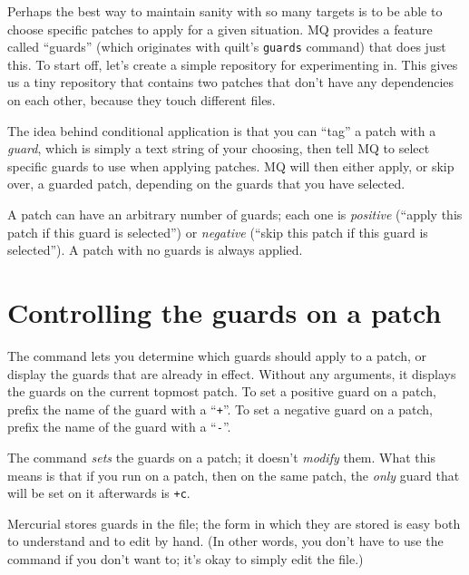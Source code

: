 Perhaps the best way to maintain sanity with so many targets is to be
able to choose specific patches to apply for a given situation.  MQ
provides a feature called ``guards'' (which originates with quilt's
\texttt{guards} command) that does just this.  To start off, let's
create a simple repository for experimenting in.
This gives us a tiny repository that contains two patches that don't
have any dependencies on each other, because they touch different files.

The idea behind conditional application is that you can ``tag'' a
patch with a \emph{guard}, which is simply a text string of your
choosing, then tell MQ to select specific guards to use when applying
patches.  MQ will then either apply, or skip over, a guarded patch,
depending on the guards that you have selected.

A patch can have an arbitrary number of guards;
each one is \emph{positive} (``apply this patch if this guard is
selected'') or \emph{negative} (``skip this patch if this guard is
selected'').  A patch with no guards is always applied.

\section{Controlling the guards on a patch}

The  command lets you determine which guards should
apply to a patch, or display the guards that are already in effect.
Without any arguments, it displays the guards on the current topmost
patch.
To set a positive guard on a patch, prefix the name of the guard with
a ``\texttt{+}''.
To set a negative guard on a patch, prefix the name of the guard with
a ``\texttt{-}''.

\begin{note}
  The  command \emph{sets} the guards on a patch; it
  doesn't \emph{modify} them.  What this means is that if you run
   on a patch, then  on
  the same patch, the \emph{only} guard that will be set on it
  afterwards is \texttt{+c}.
\end{note}

Mercurial stores guards in the  file; the form in
which they are stored is easy both to understand and to edit by hand.
(In other words, you don't have to use the  command if
you don't want to; it's okay to simply edit the 
file.)

